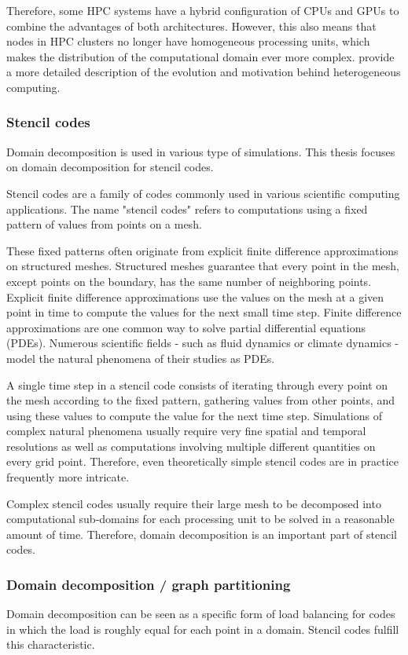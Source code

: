 Therefore, some HPC systems have a hybrid configuration of CPUs and GPUs to combine the advantages of both architectures.
However, this also means that nodes in HPC clusters no longer have homogeneous processing units, which makes the distribution of the computational domain ever more complex.
\citet{mittal2015survey} provide a more detailed description of the evolution and motivation behind heterogeneous computing.

\subsubsection{Stencil codes}
Domain decomposition is used in various type of simulations.
This thesis focuses on domain decomposition for stencil codes.

Stencil codes are a family of codes commonly used in various scientific computing applications.
The name "stencil codes" refers to computations using a fixed pattern of values from points on a mesh.

These fixed patterns often originate from explicit finite difference approximations on structured meshes.
Structured meshes guarantee that every point in the mesh, except points on the boundary, has the same number of neighboring points.
Explicit finite difference approximations use the values on the mesh at a given point in time to compute the values for the next small time step.
Finite difference approximations are one common way to solve partial differential equations (PDEs).
Numerous scientific fields - such as fluid dynamics or climate dynamics - model the natural phenomena of their studies as PDEs.

A single time step in a stencil code consists of iterating through every point on the mesh according to the fixed pattern, gathering values from other points, and using these values to compute the value for the next time step.
Simulations of complex natural phenomena usually require very fine spatial and temporal resolutions as well as computations involving multiple different quantities on every grid point.
Therefore, even theoretically simple stencil codes are in practice frequently more intricate.

Complex stencil codes usually require their large mesh to be decomposed into computational sub-domains for each processing unit to be solved in a reasonable amount of time.
Therefore, domain decomposition is an important part of stencil codes.

\subsubsection{Domain decomposition / graph partitioning}
Domain decomposition can be seen as a specific form of load balancing for codes in which the load is roughly equal for each point in a domain.
Stencil codes fulfill this characteristic.

